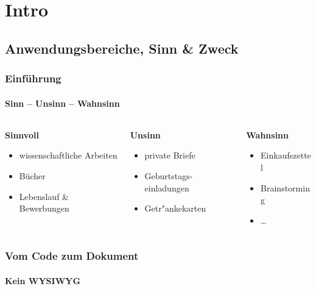\section{Intro} 

\subsection{Anwendungsbereiche, Sinn \& Zweck}
\begin{frame}[t]
\frametitle{Einf\"uhrung}
\framesubtitle{Sinn -- Unsinn -- Wahnsinn}
\bigskip
\bigskip
\bigskip

\begin{columns}[t]
\begin{column}{.3\textwidth}
\textbf{Sinnvoll}\\[3mm]
\begin{itemize}
\item wissenschaftliche Arbeiten
\item Bücher
\item Lebenslauf \& Bewerbungen
\end{itemize}
\end{column}
\begin{column}{.30\textwidth}
\textbf{Unsinn}\\[3mm]
\begin{itemize}
\item private Briefe
\item Geburtstags-einladungen
\item Getr"ankekarten
\end{itemize}
\end{column}
\begin{column}{.3\textwidth}
\textbf{Wahnsinn}\\[3mm]
\begin{itemize}
\item Einkaufszettel
\item Brainstorming
\item \ldots 
\end{itemize}
\end{column}
\end{columns}
\end{frame}


\begin{frame} 
\frametitle{Vom Code zum Dokument}
\framesubtitle{Kein WYSIWYG} 
\begin{columns}
\begin{column}{.7\textwidth}
\end{column}
\begin{column}{.3\textwidth}
\end{column}
\end{columns}
\end{frame}

